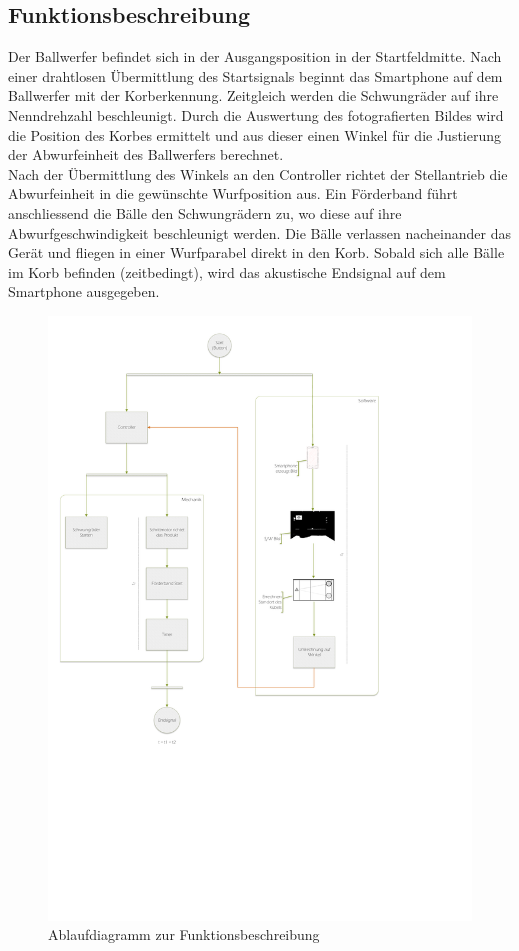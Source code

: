\subsection{Funktionsbeschreibung}
Der Ballwerfer befindet sich in der Ausgangsposition in der Startfeldmitte. 
Nach einer drahtlosen Übermittlung des Startsignals beginnt das Smartphone auf 
dem Ballwerfer mit der Korberkennung. Zeitgleich werden die Schwungräder auf ihre Nenndrehzahl beschleunigt.
Durch die Auswertung des fotografierten Bildes wird die Position des Korbes ermittelt und aus dieser einen 
Winkel für die Justierung der Abwurfeinheit des Ballwerfers berechnet.\\
Nach der Übermittlung des Winkels an den Controller richtet der Stellantrieb die Abwurfeinheit in die gewünschte Wurfposition aus. 
Ein Förderband führt anschliessend die Bälle den Schwungrädern zu, wo diese auf ihre Abwurfgeschwindigkeit beschleunigt werden. 
Die Bälle verlassen nacheinander das Gerät und fliegen in einer Wurfparabel direkt in den Korb. Sobald sich alle Bälle im Korb befinden (zeitbedingt),
wird das akustische Endsignal auf dem Smartphone ausgegeben.
\newpage
\begin{figure}[h!]
	\centering
	\includegraphics[width=1\textwidth,clip,trim=10mm 169mm 89mm 15mm]
	{Enddokumentation/Loesungskonzept/Bilder/FlowOnChart_v2.pdf}
	\caption{Ablaufdiagramm zur Funktionsbeschreibung}
	\label{fig:FlowChart}
\end{figure}
